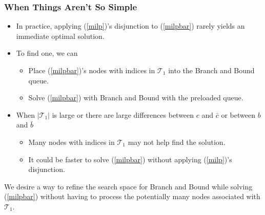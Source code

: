 \documentclass{beamer}
\begin{document}
	\begin{frame}[t]
		\frametitle{When Things Aren't So Simple}
		\small
		\begin{itemize}
			\item In practice, applying (\ref{milp})'s disjunction to (\ref{milpbar}) rarely yields an immediate optimal solution.
			\item To find one, we can
			\begin{itemize}
				\item Place (\ref{milpbar})'s nodes with indices in $ \mathcal{T}_1 $ into the Branch and Bound queue.
				\item Solve (\ref{milpbar}) with Branch and Bound with the preloaded queue.
			\end{itemize}
			\item When $ |\mathcal{T}_1| $ is large or there are large differences between $ c $ and $ \bar{c} $ or between $ b $ and $ \bar{b} $  
			\begin{itemize}
				\item Many nodes with indices in $ \mathcal{T}_1 $ may not help find the solution.
				\item It could be faster to solve (\ref{milpbar}) without applying (\ref{milp})'s disjunction.
			\end{itemize}
		\end{itemize}
		\begin{block}{}
			We desire a way to refine the search space for Branch and Bound while solving (\ref{milpbar}) without having to process the potentially many nodes associated with $ \mathcal{T}_1 $.
		\end{block}
		\normalsize
	\end{frame}
\end{document}
